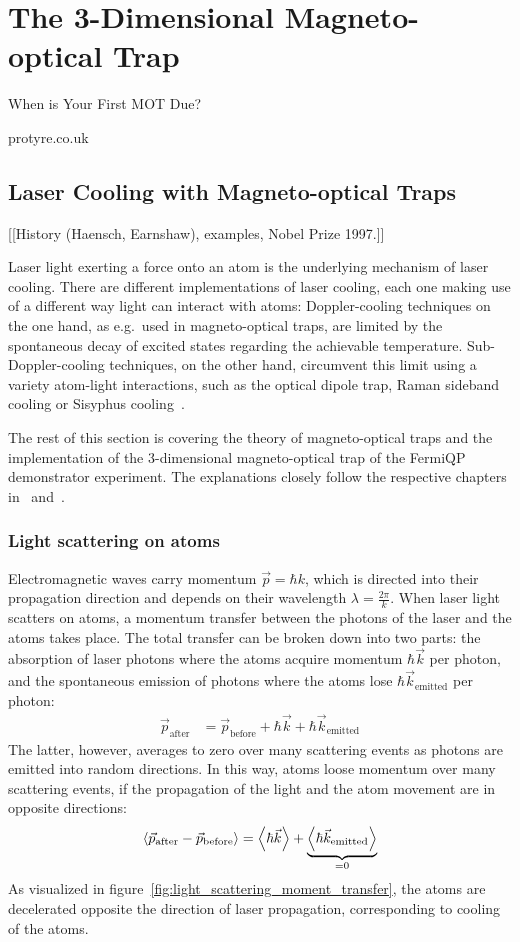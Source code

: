 \chapter{The 3-Dimensional Magneto-optical Trap}
\epigraph{When is Your First MOT Due?}{protyre.co.uk}


\section{Laser Cooling with Magneto-optical Traps}
[[History (Haensch, Earnshaw), examples, Nobel Prize 1997.]]

Laser light exerting a force onto an atom is the underlying mechanism of laser cooling. There are different implementations of laser cooling, each one making use of a different way light can interact with atoms: Doppler-cooling techniques on the one hand, as e.g.\ used in magneto-optical traps, are limited by the spontaneous decay of excited states regarding the achievable temperature. Sub-Doppler-cooling techniques, on the other hand, circumvent this limit using a variety atom-light interactions, such as the optical dipole trap, Raman sideband cooling or Sisyphus cooling~\cite{foot_atomic_2005}.

The rest of this section is covering the theory of magneto-optical traps and the implementation of the 3-dimensional magneto-optical trap of the FermiQP demonstrator experiment. The explanations closely follow the respective chapters in~\cite{foot_atomic_2005} and~\cite{metcalf_laser_1999}.

\subsection*{Light scattering on atoms}
Electromagnetic waves carry momentum $\vec p = \hbar k$, which is directed into their propagation direction and depends on their wavelength $\lambda = \frac{2\pi}{k}$. When laser light scatters on atoms, a momentum transfer between the photons of the laser and the atoms takes place. The total transfer can be broken down into two parts: the absorption of laser photons where the atoms acquire momentum $\hbar \vec k$ per photon, and the spontaneous emission of photons where the atoms lose $\hbar \vec k_\text{emitted}$ per photon:
\begin{align}
    \vec p_\text{after} &= \vec p_\text{before} + \hbar \vec k + \hbar \vec k_\text{emitted}
\end{align}
The latter, however, averages to zero over many scattering events as photons are emitted into random directions. In this way, atoms loose momentum over many scattering events, if the propagation of the light and the atom movement are in opposite directions:
\begin{align}
    \Braket{\vec p_\text{after} - \vec p_\text{before}} = \Braket{\hbar \vec k} + \underbrace{\Braket{\hbar \vec k_\text{emitted}}}_{=0}
\end{align}
As visualized in figure~\ref{fig:light_scattering_moment_transfer}, the atoms are decelerated opposite the direction of laser propagation, corresponding to cooling of the atoms.

